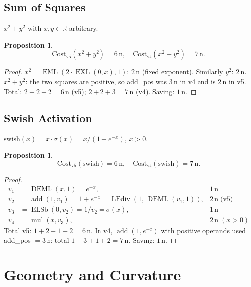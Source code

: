\documentclass[12pt,a4paper]{article}
\newtheorem{proposition}[theorem]{Proposition}
\theoremstyle{definition}
\newcommand{\EML}{\operatorname{EML}}
\newcommand{\EXL}{\operatorname{EXL}}
\newcommand{\DEML}{\operatorname{DEML}}
\newcommand{\ELSb}{\operatorname{ELSb}}
\newcommand{\LEdiv}{\operatorname{LEdiv}}
\newcommand{\mulop}{\operatorname{mul}}
\newcommand{\addop}{\operatorname{add}}
\newcommand{\Cost}{\mathrm{Cost}}
\newcommand{\R}{\mathbb{R}}
\begin{document}
\subsection{Sum of Squares}

$x^2 + y^2$ with $x, y \in \R$ arbitrary.

\begin{proposition}
\[
  \Cost_{\mathrm{v5}}(x^2 + y^2) = 6\,\text{n}, \quad
  \Cost_{\mathrm{v4}}(x^2 + y^2) = 7\,\text{n}.
\]
\end{proposition}

\begin{proof}
$x^2 = \EML(2 \cdot \EXL(0,x), 1)$: $2\,\text{n}$ (fixed exponent).
Similarly $y^2$: $2\,\text{n}$.
$x^2 + y^2$: the two squares are positive, so add\_pos was $3\,\text{n}$ in v4
and is $2\,\text{n}$ in v5.  Total: $2 + 2 + 2 = 6\,\text{n}$ (v5);
$2 + 2 + 3 = 7\,\text{n}$ (v4).  Saving: $1\,\text{n}$.
\end{proof}

\subsection{Swish Activation}

$\mathrm{swish}(x) = x \cdot \sigma(x) = x / (1 + e^{-x})$, $x > 0$.

\begin{proposition}
\[
  \Cost_{\mathrm{v5}}(\mathrm{swish}) = 6\,\text{n}, \quad
  \Cost_{\mathrm{v4}}(\mathrm{swish}) = 7\,\text{n}.
\]
\end{proposition}

\begin{proof}
\begin{align*}
  v_1 &= \DEML(x,1) = e^{-x},  & 1\,\text{n} \\
  v_2 &= \addop(1, v_1) = 1 + e^{-x}
       = \LEdiv(1,\,\DEML(v_1,1)),  & 2\,\text{n} \;\text{(v5)} \\
  v_3 &= \ELSb(0, v_2) = 1/v_2 = \sigma(x),  & 1\,\text{n} \\
  v_4 &= \mulop(x, v_3),  & 2\,\text{n} \;(x > 0)
\end{align*}
Total v5: $1 + 2 + 1 + 2 = 6\,\text{n}$.
In v4, $\addop(1, e^{-x})$ with positive operands used add\_pos $= 3\,\text{n}$:
total $1 + 3 + 1 + 2 = 7\,\text{n}$.  Saving: $1\,\text{n}$.
\end{proof}

\section{Geometry and Curvature}
\label{sec:geometry}
\end{document}
